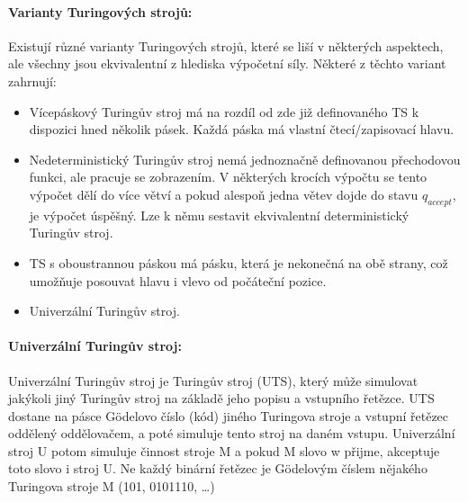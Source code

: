 \paragraph*{Varianty Turingových strojů:} Existují různé varianty Turingových strojů, které se liší v některých aspektech, ale všechny jsou ekvivalentní z hlediska výpočetní síly. Některé z těchto variant zahrnují:
\begin{itemize}
\item Vícepáskový Turingův stroj má na rozdíl od zde již definovaného TS k dispozici 
hned několik pásek. Každá páska má vlastní čtecí/zapisovací hlavu.
\item Nedeterministický Turingův stroj nemá jednoznačně definovanou přechodovou funkci, 
ale pracuje se zobrazením. V některých krocích výpočtu se tento výpočet dělí do více 
větví a pokud alespoň jedna větev dojde do stavu $q_{accept}$, je výpočet úspěšný. 
Lze k němu sestavit ekvivalentní deterministický Turingův stroj.
\item TS s oboustrannou páskou má pásku, která je nekonečná na obě strany, což umožňuje 
posouvat hlavu i vlevo od počáteční pozice.
\item Univerzální Turingův stroj.
\end{itemize}

\paragraph*{Univerzální Turingův stroj:} 
Univerzální Turingův stroj je Turingův stroj (UTS), který může simulovat jakýkoli 
jiný Turingův stroj na základě jeho popisu a vstupního řetězce. 
UTS dostane na pásce Gödelovo číslo (kód) jiného Turingova stroje a vstupní řetězec 
oddělený oddělovačem, a poté simuluje tento stroj na daném vstupu.
Univerzální stroj U potom simuluje činnost stroje M a pokud M slovo w přijme, 
akceptuje toto slovo i stroj U. Ne každý binární řetězec je Gödelovým číslem nějakého Turingova stroje M (101, 0101110, …)

